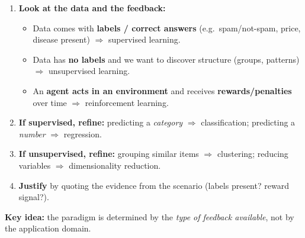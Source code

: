 \documentclass[11pt]{article}
\newcommand{\cle}[1]{{\popxbold\color{popdark}#1}}
\begin{document}
\begin{methode}
\begin{enumerate}
\item \textbf{Look at the data and the feedback:}
\begin{itemize}
\item Data comes with \textbf{labels / correct answers} (e.g.\ spam/not-spam, price, disease present) $\Rightarrow$ \cle{supervised learning}.
\item Data has \textbf{no labels} and we want to discover structure (groups, patterns) $\Rightarrow$ \cle{unsupervised learning}.
\item An \textbf{agent acts in an environment} and receives \textbf{rewards/penalties} over time $\Rightarrow$ \cle{reinforcement learning}.
\end{itemize}
\item \textbf{If supervised, refine:} predicting a \emph{category} $\Rightarrow$ \cle{classification}; predicting a \emph{number} $\Rightarrow$ \cle{regression}.
\item \textbf{If unsupervised, refine:} grouping similar items $\Rightarrow$ \cle{clustering}; reducing variables $\Rightarrow$ dimensionality reduction.
\item \textbf{Justify} by quoting the evidence from the scenario (labels present? reward signal?).
\end{enumerate}
\textbf{Key idea:} the paradigm is determined by the \emph{type of feedback available}, not by the application domain.
\end{methode}
\end{document}
